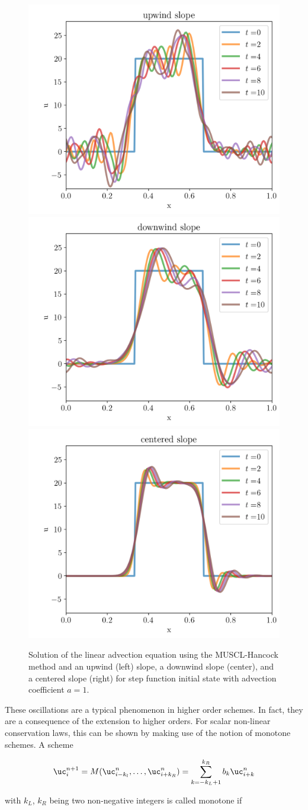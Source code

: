 \begin{figure}
    \centering
    \includegraphics[width=.33\textwidth]{./figures/FV/advection_pwlin/step-upwind.png}%
    \includegraphics[width=.33\textwidth]{./figures/FV/advection_pwlin/step-downwind.png}%
    \includegraphics[width=.33\textwidth]{./figures/FV/advection_pwlin/step-centered.png}%
    \caption{
Solution of the linear advection equation using the MUSCL-Hancock method and an upwind (left)
slope, a downwind slope (center), and a centered slope (right) for step function initial
state with advection coefficient $a = 1$.
    }
    \label{fig:pwlin-step-no-limiter}
\end{figure}




These oscillations are a typical phenomenon in higher order schemes. In fact, they are a
consequence of the extension to higher orders. For scalar non-linear conservation laws, this can be
shown by making use of the notion of monotone schemes. A scheme

\begin{align}
    \uc_i^{n+1} = M(\uc_{i-k_l}^n, \hdots, \uc_{i+k_R}^n) = \sum_{k=-k_L+1}^{k_R} b_k \uc_{i+k}^n
\label{eq:monotone-scheme}
\end{align}

with $k_L$, $k_R$ being two non-negative integers is called monotone if

